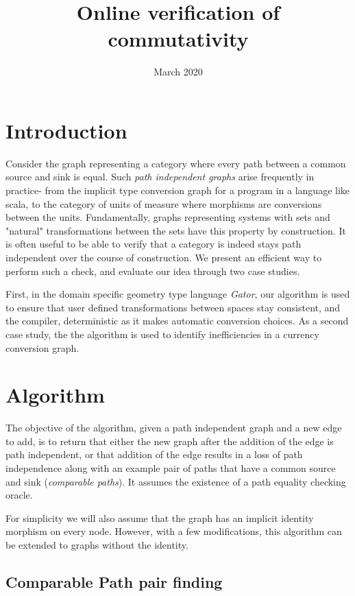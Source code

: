 \documentclass{article}
\title{Online verification of commutativity}
\author{ }
\date{March 2020}
\begin{document}
\maketitle

\section{Introduction}
Consider the graph representing a category where every path between a common source and sink is equal. 
Such \textit{path independent graphs} arise frequently in practice- from the implicit type conversion graph for a program in a language like scala, to the category of units of measure where morphisms are conversions between the units. 
Fundamentally, graphs representing systems with sets and "natural" transformations between the sets have this property by construction.
It is often useful to be able to verify that a category is indeed stays path independent over the course of construction. We present an efficient way to perform such a check, and evaluate our idea through two case studies. 

First, in the domain specific geometry type language \textit{Gator}, our algorithm is used to ensure that user defined transformations between spaces stay consistent, and the compiler, deterministic as it makes automatic conversion choices. As a second case study, the the algorithm is used to identify inefficiencies in a currency conversion graph.

\section{Algorithm}
The objective of the algorithm, given a path independent graph and a new edge to add, is to return that either the new graph after the addition of the edge is path independent, or that addition of the edge results in a loss of path independence along with an example pair of paths that have a common source and sink (\textit{comparable paths}).
It assumes the existence of a path equality checking oracle. 

For simplicity we will also assume that the graph has an implicit identity morphism on every node. However, with a few modifications, this algorithm can be extended to graphs without the identity.

\subsection{Comparable Path pair finding}
\end{document}
